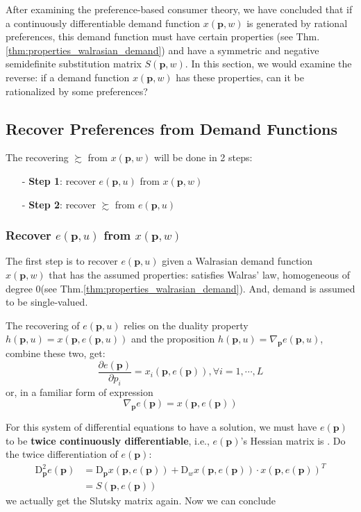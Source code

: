 After examining the preference-based consumer theory, we have concluded that if a continuously differentiable demand function $x(\mathbf{p},w)$ is generated by rational preferences, this demand function must have
certain properties (see Thm.\ref{thm:properties_walrasian_demand}) and have a symmetric and negative semidefinite substitution matrix $S(\mathbf{p},w)$. In this section, we would examine the reverse:
if a demand function $x(\mathbf{p},w)$ has these properties, can it be rationalized by some preferences?

\subsection{Recover Preferences from Demand Functions}\label{chp2:sec4:ssec1}
The recovering $\succsim$ from $x(\mathbf{p},w)$ will be done in 2 steps:
\begin{enumerate}
    \item[-] \textbf{Step 1}: recover $e(\mathbf{p},u)$ from $x(\mathbf{p},w)$
    \item[-] \textbf{Step 2}: recover $\succsim$ from $e(\mathbf{p},u)$  
\end{enumerate}

\subsubsection*{Recover $e(\mathbf{p},u)$ from $x(\mathbf{p},w)$}
The first step is to recover $e(\mathbf{p},u)$ given a Walrasian demand function $x(\mathbf{p},w)$ that has the assumed properties: satisfies Walras' law, homogeneous of degree 0(see Thm.\ref{thm:properties_walrasian_demand}).
And, demand is assumed to be single-valued.

The recovering of $e(\mathbf{p},u)$ relies on the duality property $h(\mathbf{p},u)=x(\mathbf{p},e(\mathbf{p},u))$ and the proposition $h(\mathbf{p},u)=\nabla_{\mathbf{p}}e(\mathbf{p},u)$, combine these two, get:
$$
    \frac{\partial e(\mathbf{p})}{\partial p_i}=x_i(\mathbf{p},e(\mathbf{p})),\forall i=1,\cdots,L
$$
or, in a familiar form of expression
$$
\nabla_{\mathbf{p}}e(\mathbf{p})=x(\mathbf{p},e(\mathbf{p}))
$$

For this system of differential equations to have a solution, we must have $e(\mathbf{p})$ to be \textbf{twice continuously differentiable}, i.e., $e(\mathbf{p})$'s Hessian matrix is . Do the twice differentiation of $e(\mathbf{p})$:
\begin{align*}
    \mathrm{D}^2_{\mathbf{p}}e(\mathbf{p}) &= \mathrm{D}_{\mathbf{p}}x(\mathbf{p},e(\mathbf{p})) +\mathrm{D}_w x(\mathbf{p},e(\mathbf{p}))\cdot x(\mathbf{p},e(\mathbf{p}))^T\\
    & = S(\mathbf{p},e(\mathbf{p}))
\end{align*}
we actually get the Slutsky matrix again. Now we can conclude

